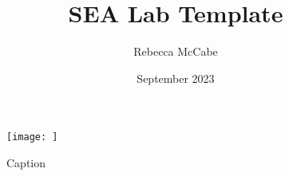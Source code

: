 \documentclass{article}
\title{SEA Lab Template}
\author{Rebecca McCabe}
\date{September 2023}
\begin{document}
\maketitle

\begin{figure}
    \centering
    \texttt{[image: ]}
    \caption{Caption}
    \label{fig:enter-label}
\end{figure}
\end{document}
